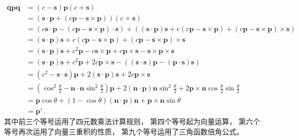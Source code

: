 \begin{align}
    \bar{\bm q}\bm p\bm q & =(c-\bm s)\bm p(c+\bm s)\nonumber                                                                                                                                                                \\
                          & =(\bm s\cdot\bm p+(c\bm p-\bm s\times\bm p))(c+\bm s)\nonumber                                                                                                                                   \\
                          & =(c\bm s\cdot\bm p-(c\bm p-\bm s\times\bm p)\cdot\bm s)+((\bm s\cdot\bm p)\bm s+c(c\bm p-\bm s\times\bm p)+(c\bm p-\bm s\times\bm p)\times\bm s)\nonumber                                        \\
                          & =(\bm s\cdot\bm p)\bm s+c(c\bm p-\bm s\times\bm p)+(c\bm p-\bm s\times\bm p)\times\bm s\nonumber                                                                                                 \\
                          & =(\bm s\cdot\bm p)\bm s+c^2\bm p-c\bm s\times\bm p+c\bm p\times\bm s-\bm s\times\bm p\times\bm s\nonumber                                                                                        \\
                          & =(\bm s\cdot\bm p)\bm s+c^2\bm p+2c\bm p\times\bm s-((\bm s\cdot\bm s)\bm p-(\bm p\cdot\bm s)\bm s)\nonumber                                                                                     \\
                          & =(c^2-\bm s\cdot\bm s)\bm p+2(\bm s\cdot\bm p)\bm s+2c\bm p\times\bm s\nonumber                                                                                                                  \\
                          & =\left(\cos^2\frac{\theta}{2}-\bm n\cdot\bm n\sin^2\frac{\theta}{2}\right)\bm p+2(\bm n\cdot\bm p)\bm n\sin^2\frac{\theta}{2}+2\bm p\times\bm n\cos\frac{\theta}{2}\sin\frac{\theta}{2}\nonumber \\
                          & =\bm p\cos\theta+(1-\cos\theta)(\bm n\cdot\bm p)\bm n+\bm p\times\bm n\sin\theta\nonumber                                                                                                        \\
                          & =\bm p'\, .
\end{align}
其中前三个等号运用了四元数乘法计算规则，
第四个等号起为向量运算，
第六个等号再次运用了向量三重积的性质，
第九个等号运用了三角函数倍角公式。

